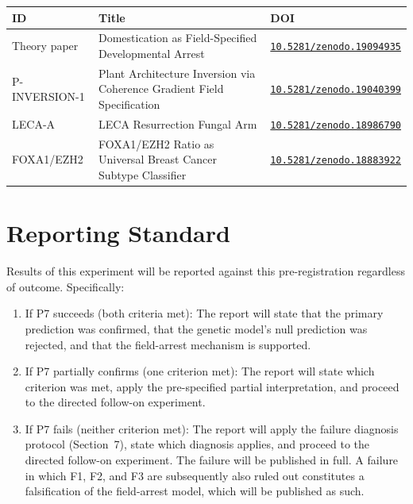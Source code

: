 \documentclass[10pt, a4paper]{article}
\begin{document}
\begin{center}
\small
\begin{tabular}{p{2.8cm}p{4.2cm}p{5.0cm}}
\toprule
\textbf{ID} & \textbf{Title} & \textbf{DOI} \\
\midrule
Theory paper &
Domestication as Field-Specified
Developmental Arrest &
\href{https://doi.org/10.5281/zenodo.19094935}
{\texttt{10.5281/zenodo.19094935}} \\[0.4em]
P-INVERSION-1 &
Plant Architecture Inversion via
Coherence Gradient Field Specification &
\href{https://doi.org/10.5281/zenodo.19040399}
{\texttt{10.5281/zenodo.19040399}} \\[0.4em]
LECA-A &
LECA Resurrection Fungal Arm &
\href{https://doi.org/10.5281/zenodo.18986790}
{\texttt{10.5281/zenodo.18986790}} \\[0.4em]
FOXA1/EZH2 &
FOXA1/EZH2 Ratio as Universal
Breast Cancer Subtype Classifier &
\href{https://doi.org/10.5281/zenodo.18883922}
{\texttt{10.5281/zenodo.18883922}} \\
\bottomrule
\end{tabular}
\end{center}

\section{Reporting Standard}
\label{sec:reporting}

Results of this experiment will be reported
against this pre-registration regardless of
outcome. Specifically:

\begin{enumerate}[itemsep=0.2em]
  \item If P7 succeeds (both criteria met):
    The report will state that the primary
    prediction was confirmed, that the
    genetic model's null prediction was
    rejected, and that the field-arrest
    mechanism is supported.

  \item If P7 partially confirms
    (one criterion met):
    The report will state which criterion
    was met, apply the pre-specified
    partial interpretation, and proceed
    to the directed follow-on experiment.

  \item If P7 fails (neither criterion met):
    The report will apply the failure
    diagnosis protocol (Section~7),
    state which diagnosis applies,
    and proceed to the directed follow-on
    experiment. The failure will be
    published in full.
    A failure in which F1, F2, and F3
    are subsequently also ruled out
    constitutes a falsification of the
    field-arrest model, which will be
    published as such.
\end{enumerate}
\end{document}
